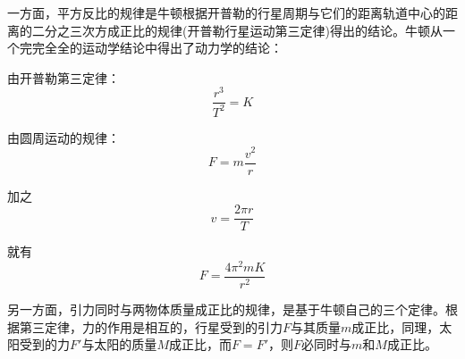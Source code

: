 \begin{prove}
一方面，平方反比的规律是牛顿根据开普勒的行星周期与它们的距离轨道中心的距离的二分之三次方成正比的规律(开普勒行星运动第三定律)得出的结论。牛顿从一个完完全全的运动学结论中得出了动力学的结论：

由开普勒第三定律：
\[
\frac{r^{3}}{T^{2}}=K
\]

由圆周运动的规律：
\[
F=m\frac{v^{2}}{r}
\]

加之
\[
v=\frac{2\pi r}{T}
\]

就有
\[F=\frac{4\pi^{2}mK}{r^{2}}\]

另一方面，引力同时与两物体质量成正比的规律，是基于牛顿自己的三个定律。根据第三定律，力的作用是相互的，行星受到的引力$F$与其质量$m$成正比，同理，太阳受到的力$F'$与太阳的质量$M$成正比，而$F=F'$，则$F$必同时与$m$和$M$成正比。
\end{prove}